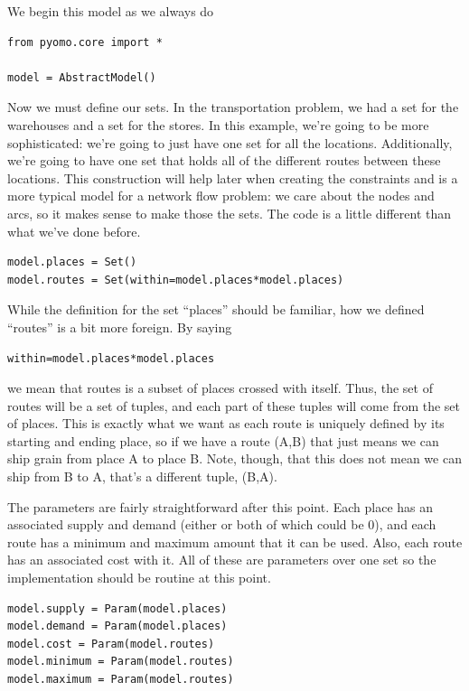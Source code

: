 \documentclass{article}
\begin{document}
We begin this model as we always do

\begin{verbatim}
from pyomo.core import *

model = AbstractModel()
\end{verbatim}

Now we must define our sets.  In the transportation problem, we had a set for the warehouses and a set for the stores.  In this example, we're going to be more sophisticated: we're going to just have one set for all the locations.  Additionally, we're going to have one set that holds all of the different routes between these locations.  This construction will help later when creating the constraints and is a more typical model for a network flow problem: we care about the nodes and arcs, so it makes sense to make those the sets.  The code is a little different than what we've done before.

\begin{verbatim}
model.places = Set()
model.routes = Set(within=model.places*model.places)
\end{verbatim}

While the definition for the set ``places'' should be familiar, how we defined ``routes'' is a bit more foreign.  By saying \begin{verbatim}within=model.places*model.places\end{verbatim} we mean that routes is a subset of places crossed with itself.  Thus, the set of routes will be a set of tuples, and each part of these tuples will come from the set of places.  This is exactly what we want as each route is uniquely defined by its starting and ending place, so if we have a route (A,B) that just means we can ship grain from place A to place B.  Note, though, that this does not mean we can ship from B to A, that's a different tuple, (B,A).

The parameters are fairly straightforward after this point.  Each place has an associated supply and demand (either or both of which could be $0$), and each route has a minimum and maximum amount that it can be used.  Also, each route has an associated cost with it.  All of these are parameters over one set so the implementation should be routine at this point.

\begin{verbatim}
model.supply = Param(model.places)
model.demand = Param(model.places)
model.cost = Param(model.routes)
model.minimum = Param(model.routes)
model.maximum = Param(model.routes)
\end{verbatim}
\end{document}
